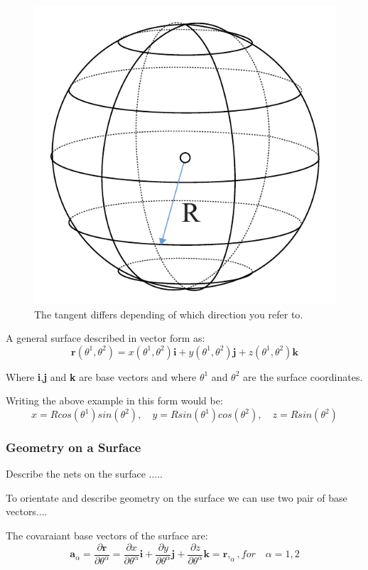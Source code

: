 \begin{figure}[H]
\centering
\includegraphics[width=0.4\linewidth ]{figure/Theory/sphereEx.pdf}                \caption{The tangent differs depending of which direction you refer to. }
\end{figure}

A general surface described in vector form as:
\begin{equation}
\textbf{r}(\theta^1,\theta^2) = x(\theta^1,\theta^2)\textbf{i} +  y(\theta^1,\theta^2)\textbf{j}+  z(\theta^1,\theta^2)\textbf{k}
\end{equation}

Where \textbf{i},\textbf{j} and \textbf{k} are base vectors and where $\theta^1$ and $\theta^2$ are the surface coordinates.



Writing the above example in this form would be:
\begin{equation}
x = R cos(\theta^1) sin (\theta^2),\quad
y = R  sin(\theta^1) cos (\theta^2),\quad
z = R sin(\theta^2)
\end{equation}

\subsubsection{Geometry on a Surface}

Describe the nets on the surface .....

To orientate and describe geometry on the surface we can use two pair of base vectors....

The covaraiant base vectors of the surface are:
\begin{equation} \label{convariantDiff}
 \textbf{a}_\alpha = \frac{\partial\textbf{r}}{\partial \theta^\alpha } = \frac{\partial x}{\partial \theta^\alpha }\textbf{i} + \frac{\partial y}{\partial \theta^\alpha }\textbf{j}+\frac{\partial z}{\partial \theta^\alpha }\textbf{k} = \textbf{r},_{\alpha} , for\quad \alpha = 1,2
\end{equation}


